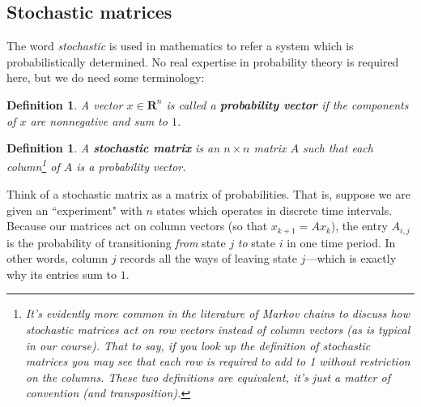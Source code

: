 \documentclass[12pt]{article}
\numberwithin{equation}{subsection}
\numberwithin{figure}{subsection}
\newtheorem{defn}[subsection]{Definition}
\theoremstyle{note}
\newcommand{\R}{\mathbf{R}}
\begin{document}
\subsection{Stochastic matrices}
The word \textit{stochastic} is used in mathematics to refer a system which is probabilistically determined. No real expertise in probability theory is required here, but we do need some terminology: 

\begin{defn}A vector $x\in \R^n$ is called a \textbf{probability vector} if the components of $x$ are nonnegative and sum to $1$. \end{defn}

\begin{defn}A \textbf{stochastic matrix} is an $n\times n$ matrix $A$ such that each column\footnote{It's evidently more common in the literature of Markov chains to discuss how stochastic matrices act on \textit{row} vectors instead of \textit{column} vectors (as is typical in our course). That to say, if you look up the definition of stochastic matrices you may see that each \textit{row} is required to add to 1 without restriction on the columns. These two definitions are equivalent, it's just a matter of convention (and transposition). } of $A$ is a probability vector. 
\end{defn}

Think of a stochastic matrix as a matrix of probabilities. That is, suppose we are given an ``experiment" with $n$ states which operates in discrete time intervals. Because our matrices act on column vectors (so that $x_{k+1}=Ax_k$), the entry $A_{i,j}$ is the probability of transitioning \textit{from} state $j$ \textit{to} state $i$ in one time period. In other words, column $j$ records all the ways of leaving state $j$---which is exactly why its entries sum to $1$. 
\end{document}
